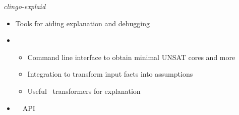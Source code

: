 \begin{frame}{\textit{clingo-explaid}}
  \begin{itemize}
    \item {} Tools for aiding explanation and debugging
    \item {} 
      \begin{itemize}
      \item Command line interface to obtain minimal UNSAT cores and more
      \item Integration to transform input facts into assumptions 
      \item Useful \clingo\ transformers for explanation
      \end{itemize}
    \item {} \ \clingo\ API
  \end{itemize}
\end{frame}
%
